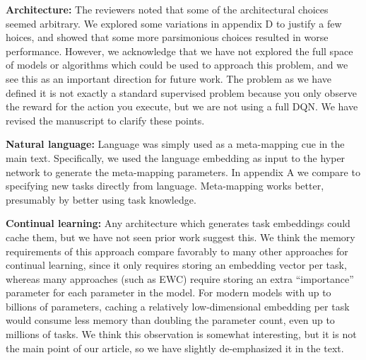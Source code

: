 \documentclass{article}
\begin{document}
\textbf{Architecture:} The reviewers noted that some of the architectural choices seemed arbitrary. We explored some variations in appendix D to justify a few hoices, and showed that some more parsimonious choices resulted in worse performance. However, we acknowledge that we have not explored the full space of models or algorithms which could be used to approach this problem, and we see this as an important direction for future work. The problem as we have defined it is not exactly a standard supervised problem because you only observe the reward for the action you execute, but we are not using a full DQN. We have revised the manuscript to clarify these points. \par 
{}
\textbf{Natural language:} Language was simply used as a meta-mapping cue in the main text. Specifically, we used the language embedding as input to the hyper network to generate the meta-mapping parameters. In appendix A we compare to specifying new tasks directly from language. Meta-mapping works better, presumably by better using task knowledge. \par
{}
\textbf{Continual learning:} Any architecture which generates task embeddings could cache them, but we have not seen prior work suggest this. We think the memory requirements of this approach compare favorably to many other approaches for continual learning, since it only requires storing an embedding vector per task, whereas many approaches (such as EWC) require storing an extra ``importance'' parameter for each parameter in the model. For modern models with up to billions of parameters, caching a relatively low-dimensional embedding per task would consume less memory than doubling the parameter count, even up to millions of tasks. We think this observation is somewhat interesting, but it is not the main point of our article, so we have slightly de-emphasized it in the text. \par
\end{document}
